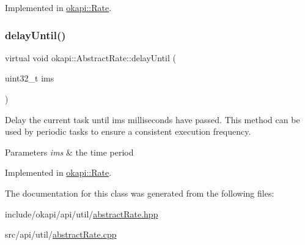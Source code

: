 Implemented in \mbox{\hyperlink{classokapi_1_1Rate_a9244a301c81388054954076b739cec50}{okapi\+::\+Rate}}.

\mbox{\label{classokapi_1_1AbstractRate_a3faf54ea2951ae5e0567cd50ddba0227}} 
\subsubsection{\texorpdfstring{delayUntil()}{delayUntil()}\hspace{0.1cm}{\footnotesize\ttfamily [2/2]}}
{\footnotesize\ttfamily virtual void okapi\+::\+Abstract\+Rate\+::delay\+Until (\begin{DoxyParamCaption}\item[{uint32\+\_\+t}]{ims }\end{DoxyParamCaption})\hspace{0.3cm}{\ttfamily [pure virtual]}}

Delay the current task until ims milliseconds have passed. This method can be used by periodic tasks to ensure a consistent execution frequency.


\begin{DoxyParams}{Parameters}
{\em ims} & the time period \\
\hline
\end{DoxyParams}


Implemented in \mbox{\hyperlink{classokapi_1_1Rate_a0d31416c85408d63830cceaa07aff1e0}{okapi\+::\+Rate}}.



The documentation for this class was generated from the following files\+:\begin{DoxyCompactItemize}
\item 
include/okapi/api/util/\mbox{\hyperlink{abstractRate_8hpp}{abstract\+Rate.\+hpp}}\item 
src/api/util/\mbox{\hyperlink{abstractRate_8cpp}{abstract\+Rate.\+cpp}}\end{DoxyCompactItemize}
